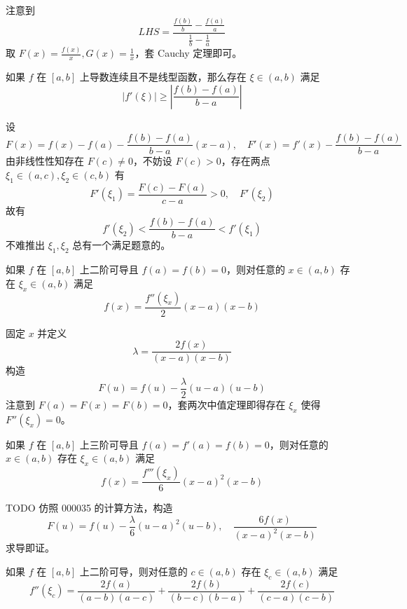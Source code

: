 \begin{solution}
	注意到
	\[ LHS = \frac{\frac{f(b)}{b} - \frac{f(a)}{a}}{\frac{1}{b} - \frac{1}{a}} \]
	取 $F(x) = \frac{f(x)}{x}, G(x) = \frac{1}{x}$，套 Cauchy 定理即可。
\end{solution}

\begin{problem}[000034]
如果 $f$ 在 $[a, b]$ 上导数连续且不是线型函数，那么存在 $\xi \in (a, b)$ 满足
\[ |f'(\xi)| \geqslant \left| \frac{f(b) - f(a)}{b - a} \right| \]
\end{problem}

\begin{solution}
	设
	\[ F(x) = f(x) - f(a) - \frac{f(b) - f(a)}{b - a}(x - a), \quad F'(x) = f'(x) - \frac{f(b) - f(a)}{b - a} \]
	由非线性性知存在 $F(c) \neq 0$，不妨设 $F(c) > 0$，存在两点 $\xi_1 \in (a, c), \xi_2 \in (c, b)$ 有
	\[ F'(\xi_1) = \frac{F(c) - F(a)}{c - a} > 0, \quad F'(\xi_2)  \]
	故有
	\[ f'(\xi_2) < \frac{f(b) - f(a)}{b - a} < f'(\xi_1) \]
	不难推出 $\xi_1, \xi_2$ 总有一个满足题意的。
\end{solution}

\begin{problem}[000035]
如果 $f$ 在 $[a, b]$ 上二阶可导且 $f(a) = f(b) = 0$，则对任意的 $x \in (a, b)$ 存在 $\xi_x \in (a, b)$ 满足
\[ f(x) = \frac{f''(\xi_x)}{2}(x - a)(x - b) \]
\end{problem}

\begin{solution}
	固定 $x$ 并定义
	\[ \lambda = \frac{2 f(x)}{(x - a)(x - b)} \]
	构造
	\[ F(u) = f(u) - \frac{\lambda}{2} (u - a)(u - b) \]
	注意到 $F(a) = F(x) = F(b) = 0$，套两次中值定理即得存在 $\xi_x$ 使得 $F''(\xi_x) = 0$。
\end{solution}

\begin{problem}[000036]
如果 $f$ 在 $[a, b]$ 上三阶可导且 $f(a) = f'(a) = f(b) = 0$，则对任意的 $x \in (a, b)$ 存在 $\xi_x \in (a, b)$ 满足
\[ f(x) = \frac{f'''(\xi_x)}{6}(x-a)^2(x-b) \]
\end{problem}

\begin{solution}
	TODO 仿照 000035 的计算方法，构造
	\[ F(u) = f(u) - \frac{\lambda}{6}(u - a)^2(u - b), \quad \frac{6f(x)}{(x - a)^2(x - b)} \]
	求导即证。
\end{solution}

\begin{problem}[000037]
如果 $f$ 在 $[a, b]$ 上二阶可导，则对任意的 $c \in (a, b)$ 存在 $\xi_c \in (a, b)$ 满足
\[ f''(\xi_c) = \frac{2 f(a)}{(a - b)(a - c)} + \frac{2 f(b)}{(b - c)(b - a)} + \frac{2f(c)}{(c- a)(c - b)} \]
\end{problem}

